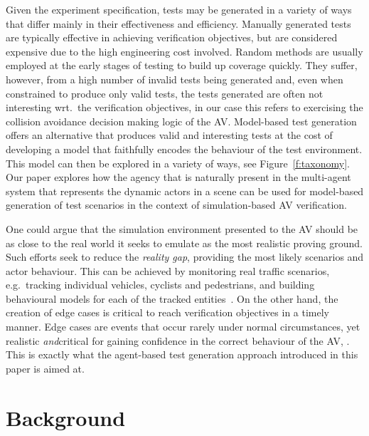 \documentclass[letterpaper, 10 pt, journal, twoside]{IEEEtran}
\begin{document}
%
Given the experiment specification, tests may be generated in a variety of ways that differ mainly in their effectiveness and efficiency. 
%
Manually generated tests are typically effective in achieving verification objectives, but are considered expensive due to the high engineering cost involved. 
%
Random methods are usually employed at the early stages of testing to build up coverage quickly. They suffer, however, from a high number of invalid tests being generated and, even when constrained to produce only valid tests, the tests generated are often not interesting wrt.\ the verification objectives, in our case this refers to exercising the collision avoidance decision making logic of the AV. 
%
Model-based test generation offers an alternative that produces valid and interesting tests at the cost of developing a model that faithfully encodes the behaviour of the test environment. This model can then be explored in a variety of ways, see Figure~\ref{f:taxonomy}.
%
Our paper explores how the agency that is naturally present in the multi-agent system that represents the dynamic actors in a scene can be used for model-based generation of test scenarios in the context of simulation-based AV verification. 

One could argue that the simulation environment presented to the AV should be as close to the real world it seeks to emulate as the most realistic proving ground. Such efforts seek to reduce the \textit{reality gap}, %
providing the most likely scenarios and actor behaviour. This can be achieved by monitoring real traffic scenarios, e.g.\ tracking individual vehicles, cyclists and pedestrians, and building behavioural models for each of the tracked entities~\cite{behbahani2019learning}.
%
On the other hand, the creation of edge cases is critical to reach verification objectives in a timely manner. Edge cases are events that occur rarely under normal circumstances, yet realistic \textit{and\/}critical for gaining confidence in the correct behaviour of the AV, .
%
This is exactly what the agent-based test generation approach introduced in this paper is aimed at.  


\section{Background}\label{s:background}
\end{document}
